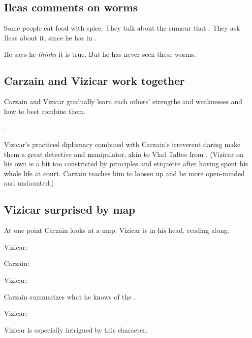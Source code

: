 \subsection{Ilcas comments on worms}
Some people eat food with \Durcaci spice. 
They talk about the rumour that . 
They ask Ilcas about it, since he has \travelled in \Durcac. 

He says he \emph{thinks} it is true. 
But he has never seen these worms. 









\subsection{Carzain and Vizicar work together}
Carzain and Vizicar gradually learn each others' strengths and weaknesses and how to best combine them. 

. 

Vizicar's practiced diplomacy combined with Carzain's irreverent daring make them a great detective and manipulator, akin to Vlad Taltos from . 
(Vizicar on his own is a bit too constricted by principles and etiquette after having spent his whole life at court. Carzain teaches him to loosen up and be more open-minded and undaunted.)







\subsection{Vizicar surprised by map}
At one point Carzain looks at a map. 
Vizicar is in his head, reading along. 

\begin{prose}
  Vizicar: 
  
  Carzain: 
  
  Vizicar: 
  
  Carzain summarizes what he knows of the \Darkfall. 
  
  Vizicar: 
  
  Vizicar is especially intrigued by this  character. 
\end{prose}








